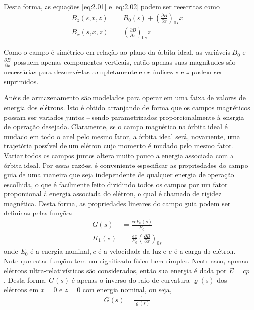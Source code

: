 Desta forma, as equações \eqref{eq:2.01} e \eqref{eq:2.02} podem ser reescritas como
\begin{align}
	B_z(s,x,z) &= B_0(s) + \left(\frac{\partial B}{\partial x}\right)_{0s} x\label{eq:2.1}\\
	B_x(s,x,z) &= \left(\frac{\partial B}{\partial x}\right)_{0s} z\label{eq:2.2}
\end{align}

Como o campo é simétrico em relação ao plano da órbita ideal, as variáveis $B_0$ e $\frac{\partial B}{\partial x}$ possuem apenas componentes verticais, então apenas suas magnitudes são necessárias para descrevê-las completamente e os índices $s$ e $z$ podem ser suprimidos.

Anéis de armazenamento são modelados para operar em uma faixa de valores de energia dos elétrons. Isto é obtido arranjando de forma que os campos magnéticos possam ser variados juntos -- sendo parametrizados proporcionalmente à energia de operação desejada. Claramente, se o campo magnético na órbita ideal é mudado em todo o anel pelo mesmo fator, a órbita ideal será, novamente, uma trajetória possível de um elétron cujo momento é mudado pelo mesmo fator. Variar todos os campos juntos altera muito pouco a energia associada com a órbita ideal. Por essas razões, é conveniente especificar as propriedades do campo guia de uma maneira que seja independente de qualquer energia de operação escolhida, o que é facilmente feito dividindo todos os campos por um fator proporcional à energia associada do elétron, o qual é chamado de rigidez magnética. Desta forma, as propriedades lineares do campo guia podem ser definidas pelas funções
\begin{align}
	G(s) &= \frac{ecB_0(s)}{E_0}\\
	K_1(s) &= \frac{ec}{E_0} \left(\frac{\partial B}{\partial x}\right)_{0s}
\end{align}
onde $E_0$ é a energia nominal, $c$ é a velocidade da luz e $e$ é a carga do elétron. Note que estas funções tem um significado físico bem simples. Neste caso, apenas elétrons ultra-relativísticos são considerados, então sua energia é dada por $E=cp$. Desta forma, $G(s)$ é apenas o inverso do raio de curvatura $\varrho(s)$ dos elétrons em $x=0$ e $z=0$ com energia nominal, ou seja,
\begin{align}
	G(s) = \frac{1}{\varrho(s)}
\end{align}

